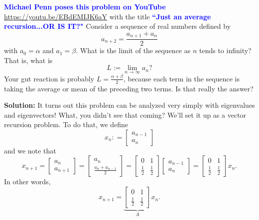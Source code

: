 \begin{example}
\label{ex:MicahelPennSequence}
\textcolor{blue}{\bf \large Michael Penn poses this problem on YouTube} \url{https://youtu.be/EBdEMIJK6aY} with the title \label{ex:MicahelPennSequence}
\textcolor{blue}{\bf \large ``Just an average recursion...OR IS IT?"} Consider a sequence of real numbers defined by
\begin{equation}
    \label{eq:MPennRecursion}
    a_{n+2} = \frac{a_{n+1} + a_n}{2}
\end{equation}
with $a_0 = \alpha$ and $a_1 = \beta$. What is the limit of the sequence as $n$ tends to infinity? That is, what is
\begin{equation}
    \label{eq:MPennLimit}
    L:= \lim_{n \to \infty} a_n ?
\end{equation}
Your gut reaction is probably $L = \frac{\alpha + \beta}{2}$, because each term in the sequence is taking the average or mean of the preceding two terms. Is that really the answer? 
\end{example}

\textbf{Solution:} It turns out this problem can be analyzed very simply with eigenvalues and eigenvectors! What, you didn't see that coming? We'll set it up as a vector recursion problem. To do that, we define
\begin{equation}
    \label{eq:defineX}
    x_n: = \left[ \begin{array}{l}
         a_{n-1}\\
         a_n 
    \end{array}\right]
\end{equation}
and we note that 
$$ x_{n+1} = \left[ \begin{array}{l}
         a_{n}\\
         a_{n+1} 
    \end{array}\right] = \left[ \begin{array}{c}
         a_{n}\\
         \frac{a_{n}+a_{n-1}}{2} 
    \end{array}\right] = \left[ \begin{array}{cc}
         0 & 1 \\
        \frac{1}{2} & \frac{1}{2}
    \end{array} \right] \left[ \begin{array}{l}
         a_{n-1}\\
         a_n 
    \end{array}\right] = \left[ \begin{array}{cc}
         0 & 1 \\
        \frac{1}{2} & \frac{1}{2}
    \end{array} \right]  x_n.$$
 In other words,    
\begin{equation}
    \label{eq:vectorRecursion}
    x_{n+1} =  \underbrace{\left[ \begin{array}{cc}
         0 & 1 \\
        \frac{1}{2} & \frac{1}{2}
    \end{array} \right]}_{A} x_n.
\end{equation}

